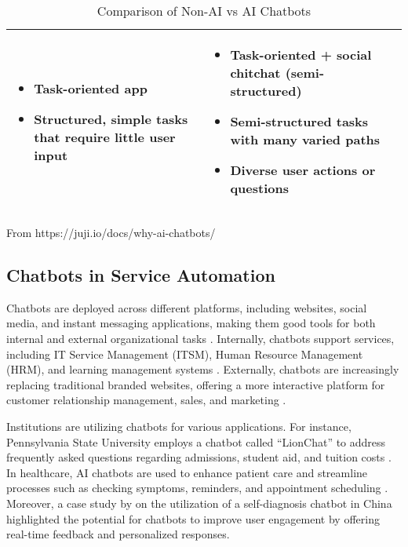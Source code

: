 \begin{table}[ht]
\begin{adjustbox}{max width=\textwidth}
\begin{tabular}{|p{3.3cm}|l|l|}
\begin{minipage}[t]{0.5\textwidth}
				\begin{itemize}
					\item Task-oriented app
					\item Structured, simple tasks that require little user input
				\end{itemize}
			\end{minipage} &
			\begin{minipage}[t]{0.5\textwidth}
				\begin{itemize}
					\item Task-oriented + social chitchat (semi-structured)
					\item Semi-structured tasks with many varied paths
					\item Diverse user actions or questions
				\end{itemize}
			\end{minipage} \\
			\hline
		\end{tabular}
	\end{adjustbox}
	\caption{Comparison of Non-AI vs AI Chatbots}
	From https://juji.io/docs/why-ai-chatbots/
	\label{Tab: chatbot_comparison}
\end{table}

\subsection{Chatbots in Service Automation}
Chatbots are deployed across different platforms, including websites, social media, and instant messaging applications, making them good tools for both internal and external organizational tasks \cite{hagberg2016, zarouali2018}. Internally, chatbots support services, including IT Service Management (ITSM), Human Resource Management (HRM), and learning management systems \cite{nawaz2019, bakouan2018}. Externally, chatbots are increasingly replacing traditional branded websites, offering a more interactive platform for customer relationship management, sales, and marketing \cite{broeck2019}.

Institutions are utilizing chatbots for various applications. For instance, Pennsylvania State University employs a chatbot called “LionChat” to address frequently asked questions regarding admissions, student aid, and tuition costs \cite{Pennstate}. In healthcare, AI chatbots are used to enhance patient care and streamline processes such as checking symptoms, reminders, and appointment scheduling \cite{altamimi2023}. Moreover, a case study by \cite{fan2021} on the utilization of a self-diagnosis chatbot in China highlighted the potential for chatbots to improve user engagement by offering real-time feedback and personalized responses.

